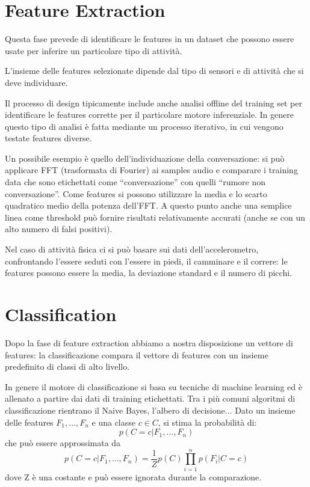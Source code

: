 \section{Feature Extraction}

Questa fase prevede di identificare le features in un dataset che possono essere
usate per inferire un particolare tipo di attività.

L'insieme delle features selezionate dipende dal tipo di sensori e di attività
che si deve individuare.

Il processo di design tipicamente include anche analisi
offline del training set per identificare le features corrette per il
particolare motore inferenziale.
In genere questo tipo di analisi è fatta mediante un processo iterativo, in cui vengono testate features diverse.

Un possibile esempio è quello dell'individuazione della conversazione: si può
applicare FFT (trasformata di Fourier) ai samples audio e comparare i training
data che sono etichettati come ``conversazione'' con quelli ``rumore non
conversazione''.
Come features si possono utilizzare la media e lo scarto quadratico medio della potenza dell'FFT.
A questo punto anche una semplice linea come threshold può fornire risultati
relativamente accurati (anche se con un alto numero di falsi positivi).

Nel caso di attività fisica ci si può basare sui dati dell'accelerometro, confrontando l'essere seduti con l'essere in piedi, il camminare e il correre: le features possono essere la media, la deviazione standard e il numero di picchi.

\section{Classification}

Dopo la fase di feature extraction abbiamo a nostra disposizione un vettore di
features: la classificazione compara il vettore di features con un insieme
predefinito di classi di alto livello.

In genere il motore di classificazione si basa su tecniche di machine learning ed è allenato a partire dai dati di training etichettati.
Tra i più comuni algoritmi di classificazione rientrano il Naive Bayes, l'albero di decisione$\ldots$
\bigbreak
Dato un insieme delle features $F_1, \ldots, F_n$ e una classe $c \in C$, si stima la
probabilità di:
\begin{equation}
p(C=c|F_1, \ldots, F_n)
\end{equation}
che può essere approssimata da
\begin{equation}
p(C=c|F_1,\ldots,F_n)=\frac{1}{Z}p(C)\prod_{i=1}^{n}p(F_i|C=c)
\end{equation}
dove Z è una costante e può essere ignorata durante la comparazione.

